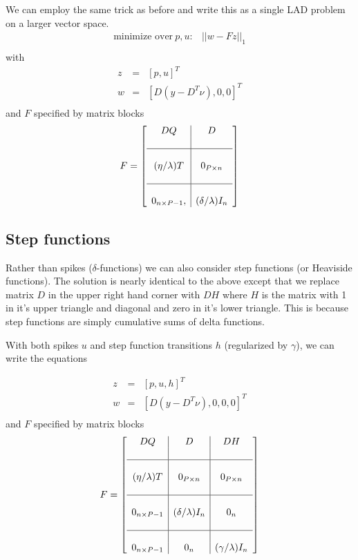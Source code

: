 \documentclass{article}
\begin{document}
We can employ the same trick as before and write this as a single LAD problem on a larger vector space.
\begin{eqnarray}
\mbox{minimize over}~ p,u : & ||w-F z||_1 \\
\end{eqnarray}
with
\begin{eqnarray}
z & = & [p , u]^T\\
w & = & [D (y - D^T \nu), 0, 0]^T \\
\end{eqnarray}
and $F$ specified by matrix blocks
\begin{equation}
F=\left[
\begin{array}{c|c}
D Q  & D   \\
\\
\hline
& \\
(\eta/\lambda) T & 0_{P \times n} \\
\\
\hline
& \\
0_{n \times P-1}, & (\delta/\lambda) I_n \\
\end{array}\right]
\end{equation}

\subsection{Step functions}

Rather than spikes ($\delta$-functions) we can also consider step functions (or Heaviside functions).
The solution is nearly identical to the above except that we replace matrix $D$ in the upper right
hand corner with $D H$ where $H$ is the matrix with 1 in it's upper triangle and diagonal and zero
in it's lower triangle. This is because step functions are simply cumulative sums of delta functions.

With both spikes $u$ and step function transitions $h$ (regularized by $\gamma$), we can write the
equations

\begin{eqnarray}
z & = & [p , u, h]^T\\
w & = & [D (y - D^T \nu), 0, 0, 0]^T \\
\end{eqnarray}
and $F$ specified by matrix blocks
\begin{equation}
F=\left[
\begin{array}{c|c|c}
D Q  & D  & D H \\
&\\
\hline
&\\
(\eta/\lambda) T & 0_{P \times n} & 0_{P \times n}\\
&\\
\hline
&\\
0_{n \times P-1} & (\delta/\lambda) I_n & 0_{n}\\
&\\
\hline
&\\
0_{n \times P-1} & 0_n & (\gamma/\lambda) I_n \\
\end{array}\right]
\end{equation}
\end{document}
